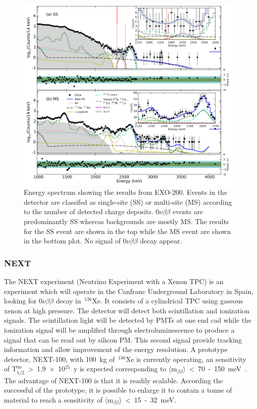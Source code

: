 \documentclass[main.tex]{subfiles}
\begin{document}
\begin{figure}[h!]
\begin{center}
\includegraphics[scale=0.4]{pictures/Chap2/EXO-200-experiment.png}
\caption{Energy spectrum showing the results from EXO-200. Events in the detector are classifed as single-site (SS) or multi-site (MS) according to the number of detected charge deposits. 0$\nu\beta\beta$ events are predominantly SS whereas backgrounds are mostly MS. The results for the SS event are shown in the top while the MS event are shown in the bottom plot. No signal of 0$\nu\beta\beta$ decay appear.}
\label{EXO200results}
\end{center}
\end{figure}


\FloatBarrier


\subsubsection{NEXT}


\NI The NEXT experiment (Neutrino Experiment with a Xenon TPC) is an experiment which will operate in the Canfranc Underground Laboratory in Spain, looking for 0$\nu\beta\beta$ decay in~$^{\text{136}}$Xe. It consists of a cylindrical TPC using gaseous xenon at high pressure. The detector will detect both scintillation and ionization signals. The scintillation light will be detected by PMTs at one end cad while the ionization signal will be amplified through electroluminescence to produce a signal that can be read out by silicon PM. This second signal provide tracking information and allow improvement of the energy resolution. A prototype detector, NEXT-100, with 100~kg of~$^{\text{136}}$Xe is currently operating, an sensitivity of T$_{\text{1/2}}^{0\nu}$~>~1.9~$\times$~10$^{\text{25}}$~y is expected corresponding to $\langle \text{m}_{\beta\beta} \rangle$~<~70~-~150~meV~\cite{NEXT}. The advantage of NEXT-100 is that it is readily scalable. According the successful of the prototype, it is possible to enlarge it to contain a tonne of material to reach a sensitivity of $\langle \text{m}_{\beta\beta} \rangle$~<~15~-~32~meV.
\end{document}
